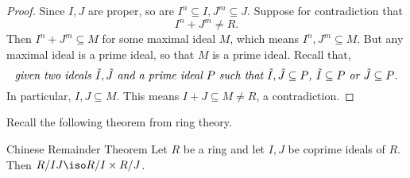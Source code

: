 \documentclass[pmath441]{subfiles}
\begin{document}
    \begin{proof}
        Since $I,J$ are proper, so are $I^n\subseteq I, J^m\subseteq J$. Suppose for contradiction that
        \begin{equation*}
            I^n+J^m \neq R.
        \end{equation*}
        Then $I^n+J^m\subseteq M$ for some maximal ideal $M$, which means $I^n,J^m\subseteq M$. But any maximal ideal is a prime ideal, so that $M$ is a prime ideal. Recall that, 
        \begin{equation*}
            \text{\textit{given two ideals $\tilde{I},\tilde{J}$ and a prime ideal $P$ such that $\tilde{I},\tilde{J}\subseteq P$, $\tilde{I}\subseteq P$ or $\tilde{J}\subseteq P$.}}
        \end{equation*}
        In particular, $I,J\subseteq M$. This means $I+J\subseteq M\neq R$, a contradiction.
    \end{proof}

    \np Recall the following theorem from ring theory.

    \begin{theorem}{Chinese Remainder Theorem}
        Let $R$ be a ring and let $I,J$ be coprime ideals of $R$. Then $R /IJ \iso R /I\times R /J$.
    \end{theorem}
\end{document}
